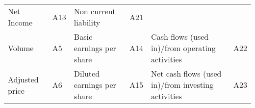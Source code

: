 \documentclass[
  11pt,
]{article}
\begin{document}
\begin{longtable}[]{@{}llllll@{}}
\begin{minipage}[t]{0.19\columnwidth}
Net Income\strut
\end{minipage} & \begin{minipage}[t]{0.09\columnwidth}\raggedright
A13\strut
\end{minipage} & \begin{minipage}[t]{0.21\columnwidth}\raggedright
Non current liability\strut
\end{minipage} & \begin{minipage}[t]{0.09\columnwidth}\raggedright
A21\strut
\end{minipage}\tabularnewline
\begin{minipage}[t]{0.16\columnwidth}\raggedright
Volume\strut
\end{minipage} & \begin{minipage}[t]{0.09\columnwidth}\raggedright
A5\strut
\end{minipage} & \begin{minipage}[t]{0.19\columnwidth}\raggedright
Basic earnings per share\strut
\end{minipage} & \begin{minipage}[t]{0.09\columnwidth}\raggedright
A14\strut
\end{minipage} & \begin{minipage}[t]{0.21\columnwidth}\raggedright
Cash flows (used in)/from operating activities\strut
\end{minipage} & \begin{minipage}[t]{0.09\columnwidth}\raggedright
A22\strut
\end{minipage}\tabularnewline
\begin{minipage}[t]{0.16\columnwidth}\raggedright
Adjusted price\strut
\end{minipage} & \begin{minipage}[t]{0.09\columnwidth}\raggedright
A6\strut
\end{minipage} & \begin{minipage}[t]{0.19\columnwidth}\raggedright
Diluted earnings per share\strut
\end{minipage} & \begin{minipage}[t]{0.09\columnwidth}\raggedright
A15\strut
\end{minipage} & \begin{minipage}[t]{0.21\columnwidth}\raggedright
Net cash flows (used in)/from investing activities\strut
\end{minipage} & \begin{minipage}[t]{0.09\columnwidth}\raggedright
A23\strut
\end{minipage}\tabularnewline

\end{longtable}
\end{document}
